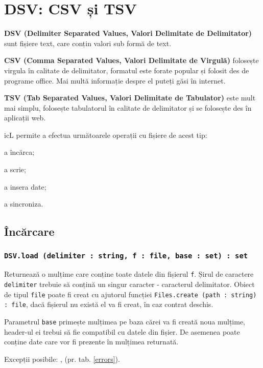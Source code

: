 \section{DSV: CSV și TSV}

{\bf DSV (Delimiter Separated Values, Valori Delimitate de Delimitator)} sunt fișiere text, care conțin valori sub formă de text.

{\bf CSV (Comma Separated Values, Valori Delimitate de Virgulă)} folosește virgula în calitate de delimitator, formatul este forate popular și folosit des de programe office. Mai multă informație despre el puteți găsi în internet.

{\bf TSV (Tab Separated Values, Valori Delimitate de Tabulator)} este mult mai simplu, folosește tabulatorul în calitate de delimitator și se folosește des în aplicații web.

icL permite a efectua următoarele operații cu fișiere de acest tip:
\begin{icItems}
	\item a încărca;
	\item a scrie;
	\item a insera date;
	\item a sincroniza.
\end{icItems}

\subsection{Încărcare}

\subsubsection{\texttt{DSV.load (delimiter : string, f : file, base : set) : set}}

Returnează o mulțime care conține toate datele din fișierul \texttt{f}. Șirul de caractere \texttt{delimiter} trebuie să conțină un singur caracter - caracterul delimitator. Obiect de tipul \texttt{file} poate fi creat cu ajutorul funcției \texttt{Files.create (path : string) : file}, dacă fișierul nu există el va fi creat, în caz contrat deschis.

Parametrul \texttt{base} primește mulțimea pe baza cărei va fi creată noua mulțime, header-ul ei trebui să fie compatibil cu datele din fișier. De asemenea poate conține date care vor fi prezente în mulțimea returnată.

Excepții posibile: ,  (pr. tab. \ref{errors}).

